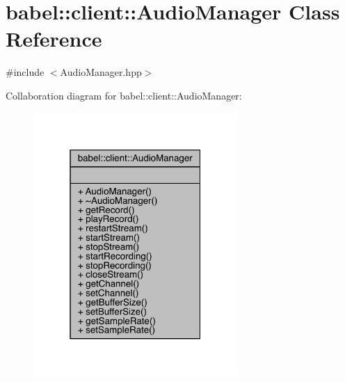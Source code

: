 \hypertarget{classbabel_1_1client_1_1_audio_manager}{}\section{babel\+:\+:client\+:\+:Audio\+Manager Class Reference}
\label{classbabel_1_1client_1_1_audio_manager}


{\ttfamily \#include $<$Audio\+Manager.\+hpp$>$}



Collaboration diagram for babel\+:\+:client\+:\+:Audio\+Manager\+:\nopagebreak
\begin{figure}[H]
\begin{center}
\leavevmode
\includegraphics[width=220pt]{classbabel_1_1client_1_1_audio_manager__coll__graph}
\end{center}
\end{figure}
